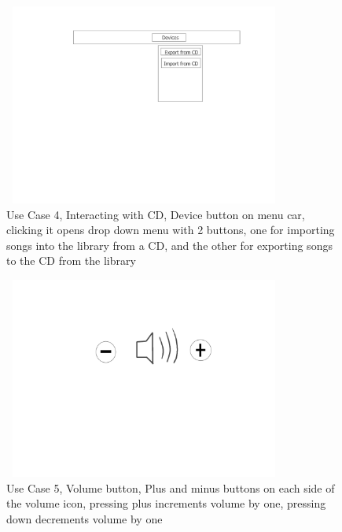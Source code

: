 \documentclass[10pt,conference,onecolumn,compsoc]{IEEEtran}
\begin{document}
\begin{figure}
\includegraphics[height=250px, width=350px]{Play_CD_Mock_Up.jpg}
\caption{Use Case 4, Interacting with CD, Device button on menu car, clicking it opens drop down menu with 2 buttons, one for importing songs into the library from a CD, and the other for exporting songs to the CD from the library}
\label{PlayCD}
\end{figure}

\begin{figure}
\includegraphics[height=250px, width=350px]{Volume_Button_Mock_Up.jpg}
\caption{Use Case 5, Volume button, Plus and minus buttons on each side of the volume icon, pressing plus increments volume by one, pressing down decrements volume by one}
\label{VolumeButton}
\end{figure}
\end{document}
